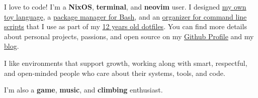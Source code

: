 \documentclass[10pt,a4paper,ragged2e,withhyper]{altacv}
\newcommand{\accentbold}[1]{\textbf{\textcolor{accent}{#1}}}
\begin{document}
\begin{paracol}{2}
\begingroup
\setlength{\parskip}{1em}

I love to code! I'm a \accentbold{NixOS}, \accentbold{terminal}, and \accentbold{neovim} user. I designed \href{https://github.com/juanibiapina/marco}{my own toy language}, a \href{https://github.com/basherpm/basher}{package manager for Bash}, and an \href{https://github.com/juanibiapina/sub}{organizer for command line scripts} that I use as part of my \href{https://github.com/juanibiapina/dotfiles}{12 years old dotfiles}. You can find more details about personal projects, passions, and open source on my \href{https://github.com/juanibiapina/}{Github Profile} and my \href{https://juanibiapina.github.io/}{blog}.

I like environments that support growth, working along with smart, respectful, and open-minded people who care about their systems, tools, and code.

I’m also a \accentbold{game}, \accentbold{music}, and \accentbold{climbing} enthusiast.

\endgroup




\newpage



\medskip



%
%
%


\end{paracol}
\end{document}
